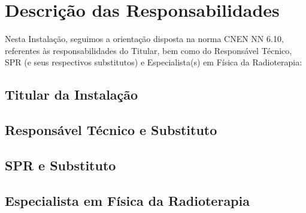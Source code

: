 \chapter{Descrição das Responsabilidades}
\label{ch:descricao_responsabilidade}
Nesta Instalação, seguimos a orientação disposta na norma CNEN NN 6.10, referentes às responsabilidades do Titular, bem como do Responsável Técnico, SPR (e seus respectivos substitutos) e Especialista(s) em Física da Radioterapia:

\section{Titular da Instalação}


\section{Responsável Técnico e Substituto}

 
\section{SPR e Substituto}

    
\section{Especialista em Física da Radioterapia}

